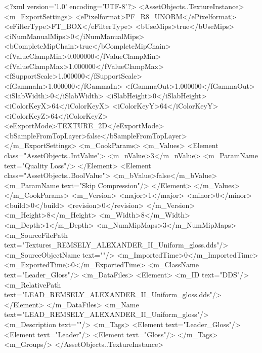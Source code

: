 <?xml version='1.0' encoding='UTF-8'?>
<AssetObjects..TextureInstance>
  <m_ExportSettings>
    <ePixelformat>PF_R8_UNORM</ePixelformat>
    <eFilterType>FT_BOX</eFilterType>
    <bUseMips>true</bUseMips>
    <iNumManualMips>0</iNumManualMips>
    <bCompleteMipChain>true</bCompleteMipChain>
    <fValueClampMin>0.000000</fValueClampMin>
    <fValueClampMax>1.000000</fValueClampMax>
    <fSupportScale>1.000000</fSupportScale>
    <fGammaIn>1.000000</fGammaIn>
    <fGammaOut>1.000000</fGammaOut>
    <iSlabWidth>0</iSlabWidth>
    <iSlabHeight>0</iSlabHeight>
    <iColorKeyX>64</iColorKeyX>
    <iColorKeyY>64</iColorKeyY>
    <iColorKeyZ>64</iColorKeyZ>
    <eExportMode>TEXTURE_2D</eExportMode>
    <bSampleFromTopLayer>false</bSampleFromTopLayer>
  </m_ExportSettings>
  <m_CookParams>
    <m_Values>
      <Element class="AssetObjects..IntValue">
        <m_nValue>3</m_nValue>
        <m_ParamName text="Quality Loss"/>
      </Element>
      <Element class="AssetObjects..BoolValue">
        <m_bValue>false</m_bValue>
        <m_ParamName text="Skip Compression"/>
      </Element>
    </m_Values>
  </m_CookParams>
  <m_Version>
    <major>1</major>
    <minor>0</minor>
    <build>0</build>
    <revision>0</revision>
  </m_Version>
  <m_Height>8</m_Height>
  <m_Width>8</m_Width>
  <m_Depth>1</m_Depth>
  <m_NumMipMaps>3</m_NumMipMaps>
  <m_SourceFilePath text="Textures\LEAD_REMSELY_ALEXANDER_II_Uniform_gloss.dds"/>
  <m_SourceObjectName text=""/>
  <m_ImportedTime>0</m_ImportedTime>
  <m_ExportedTime>0</m_ExportedTime>
  <m_ClassName text="Leader_Gloss"/>
  <m_DataFiles>
    <Element>
      <m_ID text="DDS"/>
      <m_RelativePath text="LEAD_REMSELY_ALEXANDER_II_Uniform_gloss.dds"/>
    </Element>
  </m_DataFiles>
  <m_Name text="LEAD_REMSELY_ALEXANDER_II_Uniform_gloss"/>
  <m_Description text=""/>
  <m_Tags>
    <Element text="Leader_Gloss"/>
    <Element text="Leader"/>
    <Element text="Gloss"/>
  </m_Tags>
  <m_Groups/>
</AssetObjects..TextureInstance>
